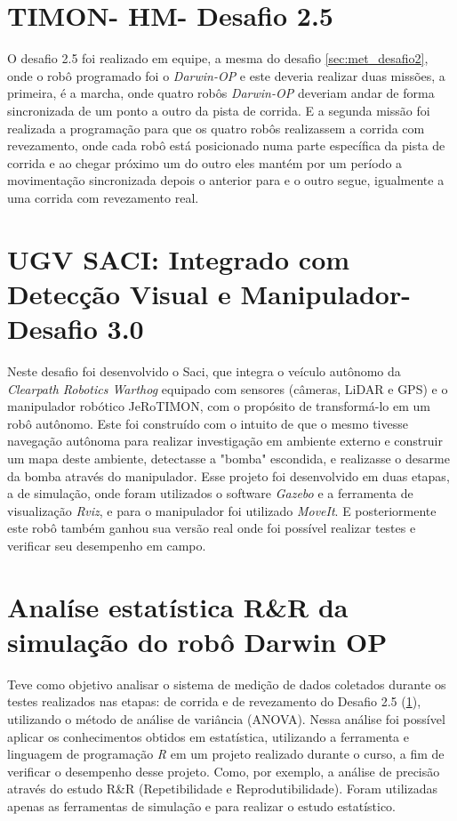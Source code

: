 \section{TIMON- HM- Desafio 2.5}
\label{sec:met_desafio2_5}
O desafio 2.5 foi realizado em equipe, a mesma do desafio \ref{sec:met_desafio2}, onde o robô programado foi o \textit{Darwin-OP} e este deveria realizar duas missões, a primeira, é a marcha, onde quatro robôs \textit{Darwin-OP} deveriam andar de forma sincronizada de um ponto a outro da pista de corrida. E a segunda missão foi realizada a programação para que os quatro robôs realizassem a corrida com revezamento, onde cada robô está posicionado numa parte específica da pista de corrida e ao chegar próximo um do outro eles mantém por um período a movimentação sincronizada depois o anterior para e o outro segue, igualmente a uma corrida com revezamento real.


\section{UGV SACI: Integrado com Detecção Visual e Manipulador- Desafio 3.0}
\label{sec:met_desafio3}
Neste desafio foi desenvolvido o Saci, que integra o veículo autônomo da \textit{Clearpath Robotics Warthog} equipado com sensores (câmeras, LiDAR e GPS) e o manipulador robótico JeRoTIMON, com o propósito de transformá-lo em um robô autônomo. Este foi construído com o intuito de que o mesmo tivesse navegação autônoma para realizar investigação em ambiente externo e construir um mapa deste ambiente, detectasse a "bomba" escondida, e realizasse o desarme da bomba através do manipulador. 
Esse projeto foi desenvolvido em duas etapas, a de simulação, onde foram utilizados o software  \textit{Gazebo} e a ferramenta de visualização \textit{Rviz}, e para o manipulador foi utilizado \textit{MoveIt}. E posteriormente este robô também ganhou sua versão real onde foi possível realizar testes e verificar seu desempenho em campo.



\section{Analíse estatística R\&R da simulação do robô Darwin OP}
\label{sec:met_analise_darwin}
Teve como objetivo analisar o sistema de medição de dados coletados durante os testes realizados nas etapas: de corrida e de revezamento do Desafio 2.5 (\ref{sec:met_desafio2_5}), utilizando o método de análise de variância (ANOVA). Nessa análise foi possível aplicar os conhecimentos obtidos em estatística, utilizando a ferramenta e linguagem de programação \textit{R} em um projeto realizado durante o curso, a fim de verificar o desempenho desse projeto. Como, por exemplo, a análise de precisão através do estudo R\&R (Repetibilidade e Reprodutibilidade). Foram utilizadas apenas as ferramentas de simulação e para realizar o estudo estatístico.


